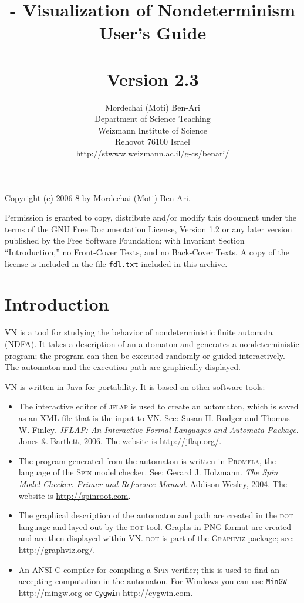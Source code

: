 \documentclass[11pt]{article}
\title{\vn{} - Visualization of Nondeterminism\\User's Guide\\\mbox{}\\\large{Version 2.3}}
\author{Mordechai (Moti) Ben-Ari\\
Department of Science Teaching\\
Weizmann Institute of Science\\
Rehovot 76100 Israel\\
\textsf{http://stwww.weizmann.ac.il/g-cs/benari/}}
\newcommand{\vn}{\textsc{VN}}
\newcommand{\jf}{\textsc{jflap}}
\newcommand{\dt}{\textsc{dot}}
\newcommand{\spn}{\textsc{Spin}}
\newcommand{\prm}{\textsc{Promela}}
\newcommand{\p}[1]{\texttt{#1}}
\begin{document}
\maketitle
\thispagestyle{empty}

\vfil

\begin{center}
Copyright (c) 2006-8 by Mordechai (Moti) Ben-Ari.
\end{center}
Permission is granted to copy, distribute and/or modify this document
under the terms of the GNU Free Documentation License, Version 1.2
or any later version published by the Free Software Foundation;
with Invariant Section ``Introduction,'' no Front-Cover Texts, and no Back-Cover Texts.
A copy of the license is included in the file \p{fdl.txt}
included in this archive.
\vfil

\newpage

\section{Introduction}

\vn{} is a tool for studying the behavior of nondeterministic finite automata 
(NDFA). It takes a description of an automaton and generates a nondeterministic 
program; the program can then be executed randomly or guided interactively. The 
automaton and the execution path are graphically displayed.

\vn{} is written in Java for portability. It is based on other software tools: 
\begin{itemize}
  \item The interactive editor of \jf{} is used to 
create an automaton, which is saved as an XML file that is the input to \vn{}. See: 
Susan H. Rodger and Thomas W. Finley. \textit{JFLAP: An Interactive Formal 
Languages and Automata Package}. Jones \& Bartlett, 2006. The website is 
\url{http://jflap.org/}.
\item The program generated from the automaton is written in 
\prm{}, the language of the \spn{} model checker. See: Gerard J. Holzmann. 
\textit{The Spin Model Checker: Primer and Reference Manual}. Addison-Wesley, 
2004. The website is \url{http://spinroot.com}.
\item The graphical description of the automaton and path are created in the \dt{} 
language and layed out by the \dt{} tool. Graphs in PNG format are created and
are then displayed within \vn{}. \dt{} is part of the \textsc{Graphviz} 
package; see: \url{http://graphviz.org/}.
\item An ANSI C compiler for compiling a \spn{} verifier; this is used to find
an accepting computation in the automaton. For Windows you can use
\p{MinGW}  \url{http://mingw.org} or \p{Cygwin} \url{http://cygwin.com}.
\end{itemize}
\end{document}
